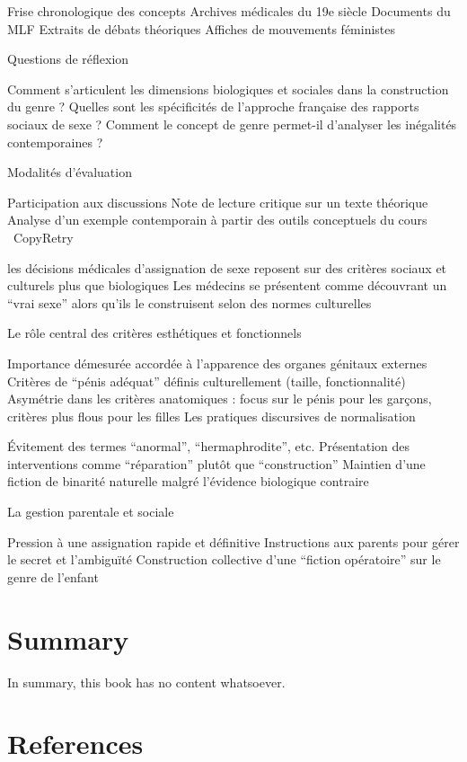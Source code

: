 \documentclass[
  letterpaper,
  DIV=11,
  numbers=noendperiod]{scrreprt}
\begin{document}
Frise chronologique des concepts Archives médicales du 19e siècle
Documents du MLF Extraits de débats théoriques Affiches de mouvements
féministes

Questions de réflexion

Comment s'articulent les dimensions biologiques et sociales dans la
construction du genre ? Quelles sont les spécificités de l'approche
française des rapports sociaux de sexe ? Comment le concept de genre
permet-il d'analyser les inégalités contemporaines ?

Modalités d'évaluation

Participation aux discussions Note de lecture critique sur un texte
théorique Analyse d'un exemple contemporain à partir des outils
conceptuels du cours ~CopyRetry

les décisions médicales d'assignation de sexe reposent sur des critères
sociaux et culturels plus que biologiques Les médecins se présentent
comme découvrant un ``vrai sexe'' alors qu'ils le construisent selon des
normes culturelles

Le rôle central des critères esthétiques et fonctionnels

Importance démesurée accordée à l'apparence des organes génitaux
externes Critères de ``pénis adéquat'' définis culturellement (taille,
fonctionnalité) Asymétrie dans les critères anatomiques : focus sur le
pénis pour les garçons, critères plus flous pour les filles Les
pratiques discursives de normalisation

Évitement des termes ``anormal'', ``hermaphrodite'', etc. Présentation
des interventions comme ``réparation'' plutôt que ``construction''
Maintien d'une fiction de binarité naturelle malgré l'évidence
biologique contraire

La gestion parentale et sociale

Pression à une assignation rapide et définitive Instructions aux parents
pour gérer le secret et l'ambiguïté Construction collective d'une
``fiction opératoire'' sur le genre de l'enfant


\chapter{Summary}\label{summary}

In summary, this book has no content whatsoever.


\chapter*{References}\label{references}
\end{document}
